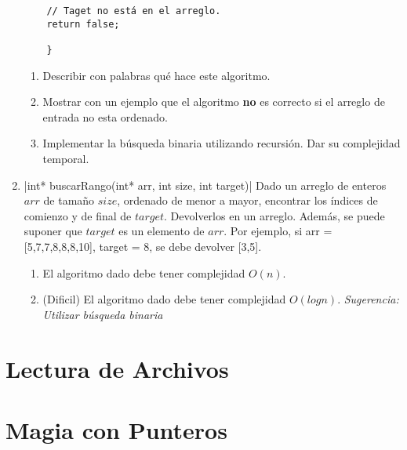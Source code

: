 \documentclass[titlepage,oneside]{book}
\begin{document}
\begin{enumerate}
\begin{verbatim}
    // Taget no está en el arreglo.
    return false;

    }
    \end{verbatim} 

    \begin{enumerate}
        \item Describir con palabras qué hace este algoritmo.
        \item Mostrar con un ejemplo que el algoritmo \textbf{no} es correcto si el arreglo de entrada no esta ordenado.
        \item Implementar la búsqueda binaria utilizando recursión. Dar su complejidad temporal.
    \end{enumerate}

        
    \item{}|int* buscarRango(int* arr, int size, int target)|
    Dado un arreglo de enteros $arr$ de tamaño $size$, ordenado de menor a mayor, encontrar los índices de comienzo y de final de $target$. Devolverlos en un arreglo. Además, se puede suponer que $target$ es un elemento de $arr$.
    \newline
    Por ejemplo, si arr = [5,7,7,8,8,8,10], target = 8, se debe devolver [3,5].
    \begin{enumerate}
        \item El algoritmo dado debe tener complejidad $O(n)$.
        \item (Dificil) El algoritmo dado debe tener complejidad $O(log{}n)$.\newline
        \textit{Sugerencia: Utilizar búsqueda binaria}
    \end{enumerate}

        
        
    \end{enumerate}
    

\chapter{Lectura de Archivos}

\chapter{Magia con Punteros}
\end{document}
